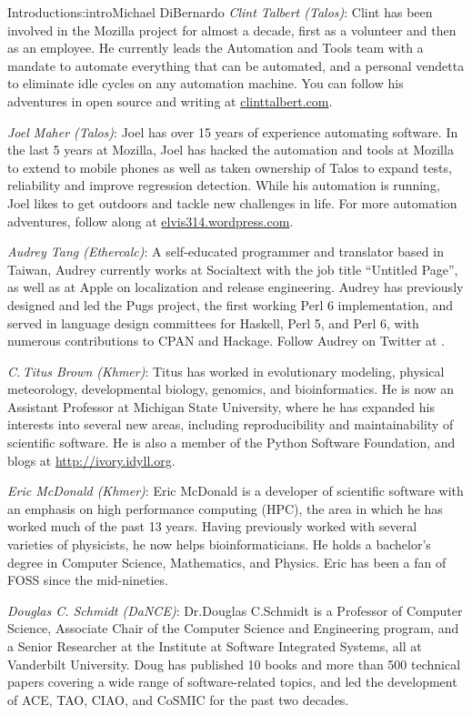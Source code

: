 \begin{aosachapter}{Introduction}{s:intro}{Michael DiBernardo}
\emph{Clint Talbert (Talos)}: Clint has been involved in the Mozilla project for almost a decade, first as a volunteer and then as an employee. He currently leads the Automation and Tools team with a mandate to automate everything that can be automated, and a personal vendetta to eliminate idle cycles on any automation machine. You can follow his adventures in open source and writing at \url{clinttalbert.com}.  

\emph{Joel Maher (Talos)}: Joel has over 15 years of experience automating software.  In the last 5 years at Mozilla, Joel has hacked the automation and tools at Mozilla to extend to mobile phones as well as taken ownership of Talos to expand tests, reliability and improve regression detection.  While his automation is running, Joel likes to get outdoors and tackle new challenges in life.  For more automation adventures, follow along at \url{elvis314.wordpress.com}.

\emph{Audrey Tang (Ethercalc)}: A self-educated programmer and translator based in Taiwan, Audrey currently works at Socialtext with the job title ``Untitled Page'', as well as at Apple on localization and release engineering. Audrey has previously designed and led the Pugs project, the first working Perl 6 implementation, and served in language design committees for Haskell, Perl 5, and Perl 6, with numerous contributions to CPAN and Hackage. Follow Audrey on Twitter at .


\emph{C.\,Titus Brown (Khmer)}: Titus has worked in evolutionary modeling, physical meteorology, developmental biology, genomics, and bioinformatics. He is now an Assistant Professor at Michigan State University, where he has expanded his interests into several new areas, including reproducibility and maintainability of scientific software. He is also a member of the Python Software Foundation, and blogs at \url{http://ivory.idyll.org}.

\emph{Eric McDonald (Khmer)}: Eric McDonald is a developer of scientific software with an emphasis on high performance computing (HPC), the area in which he has worked much of the past 13 years. Having previously worked with several varieties of physicists, he now helps  bioinformaticians. He holds a bachelor's degree in Computer Science, Mathematics, and Physics. Eric has been a fan of FOSS since the mid-nineties.

\emph{Douglas C. Schmidt (DaNCE)}: Dr.\@ Douglas C.\@ Schmidt is a Professor of Computer Science, Associate Chair of the Computer Science and Engineering program, and a Senior Researcher at the Institute at Software Integrated Systems, all at Vanderbilt University.  Doug has published 10 books and more than 500 technical papers covering a wide range of software-related topics, and led the development of ACE, TAO, CIAO, and CoSMIC for the past two decades.


\end{aosachapter}
